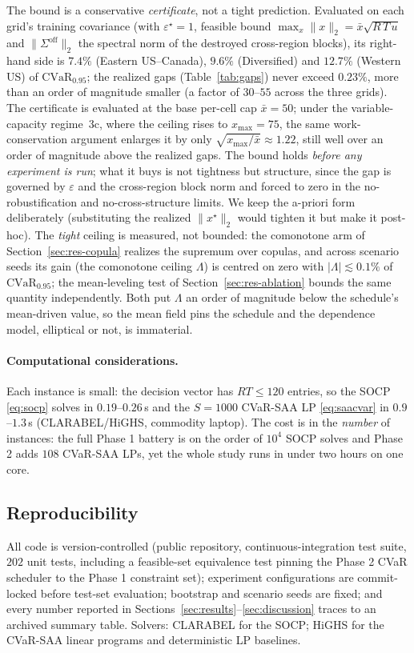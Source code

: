 \documentclass[12pt]{article}
\newcommand{\CVaR}{\mathrm{CVaR}}
\begin{document}
\noindent The bound is a conservative \emph{certificate}, not a tight prediction.
Evaluated on each grid's training covariance (with $\varepsilon^\star=1$, feasible
bound $\max_{x}\lVert x\rVert_2=\bar x\sqrt{R\,T\,u}$ and $\lVert\Sigma^{\mathrm{off}}
\rVert_2$ the spectral norm of the destroyed cross-region blocks), its right-hand
side is $7.4\%$ (Eastern US--Canada), $9.6\%$ (Diversified) and $12.7\%$ (Western
US) of $\CVaR_{0.95}$; the realized gaps (Table~\ref{tab:gaps}) never exceed
$0.23\%$, more than an order of magnitude smaller (a factor of $30$--$55$ across the
three grids). The certificate is evaluated at the base per-cell cap $\bar x=50$; under the
variable-capacity regime~3c, where the ceiling rises to $x_{\max}=75$, the same
work-conservation argument enlarges it by only $\sqrt{x_{\max}/\bar x}\approx1.22$, still
well over an order of magnitude above the realized gaps. The bound holds \emph{before any experiment
is run}; what it buys is not tightness but structure, since the gap is governed by
$\varepsilon$ and the cross-region block norm and forced to zero in the
no-robustification and no-cross-structure limits. We keep the a-priori form
deliberately (substituting the realized $\lVert x^\star\rVert_2$ would tighten it but
make it post-hoc). The \emph{tight} ceiling is measured, not
bounded: the comonotone arm of Section~\ref{sec:res-copula} realizes the supremum
over copulas, and across scenario seeds its gain (the comonotone ceiling $\Lambda$) is centred on zero with
$|\Lambda|\lesssim0.1\%$ of $\CVaR_{0.95}$; the mean-leveling test of
Section~\ref{sec:res-ablation} bounds the same quantity independently. Both put
$\Lambda$ an order of magnitude below the schedule's mean-driven value, so the mean
field pins the schedule and the dependence model, elliptical or not, is immaterial.

\paragraph{Computational considerations.} Each instance is small: the decision
vector has $RT\le120$ entries, so the SOCP \eqref{eq:socp} solves in $0.19$--$0.26$\,s
and the $S=1000$ CVaR-SAA LP \eqref{eq:saacvar} in $0.9$--$1.3$\,s (CLARABEL/HiGHS,
commodity laptop). The cost is in the \emph{number} of instances: the full Phase 1
battery is on the order of $10^4$ SOCP solves and Phase 2 adds $108$ CVaR-SAA LPs,
yet the whole study runs in under two hours on one core.

\subsection{Reproducibility}\label{sec:repro}
All code is version-controlled (public repository, continuous-integration test
suite, $202$ unit tests, including a feasible-set equivalence test pinning the
Phase 2 CVaR scheduler to the Phase 1 constraint set); experiment configurations
are commit-locked before test-set evaluation; bootstrap and scenario seeds are
fixed; and every number reported in
Sections~\ref{sec:results}--\ref{sec:discussion} traces to an archived summary
table. Solvers: CLARABEL for the SOCP; HiGHS for the CVaR-SAA linear programs
and deterministic LP baselines.
\end{document}
